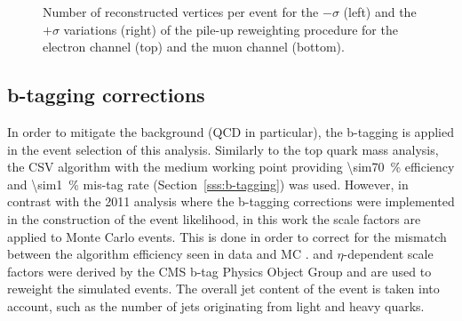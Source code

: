 \begin{figure}[!htpb]
\begin{center}
	\caption{\label{fig:pileup_vertices_variations}
    Number of reconstructed vertices per event for the $-\sigma$ (left) and the $+\sigma$ variations (right) of
    the pile-up reweighting procedure for the electron channel (top) and the muon channel (bottom).}
\end{center}
\end{figure}


\subsection{b-tagging corrections}
\label{ss_xsection:btagging_corrections}
In order to mitigate the background (QCD in particular), the b-tagging is applied in the event selection of this
analysis. Similarly to the top quark mass analysis, the CSV algorithm with the medium working point providing
\SI{\sim70}{\percent} efficiency and \SI{\sim1}{\percent} mis-tag rate (Section~\ref{sss:b-tagging}) was used. However,
in contrast with the 2011 analysis where the b-tagging corrections were implemented in the construction of the event
likelihood, in this work the scale factors are applied to Monte Carlo events. This is done in order to correct for the
mismatch between the algorithm efficiency seen in data and MC \autocite{btagging_CMS_8TeV_results}. \pt and
$\eta$-dependent scale factors were derived by the CMS b-tag Physics Object Group \autocite{btag_weights_2011} and are
used to reweight the simulated events. The overall jet content of the event is taken into account, such as the number of
jets originating from light and heavy quarks.

